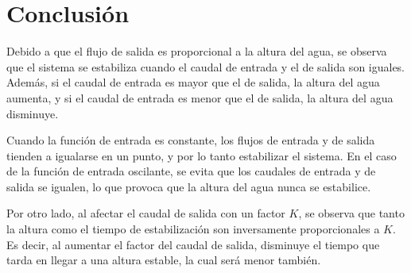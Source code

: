 \documentclass[12pt]{article}
\begin{document}
\section*{Conclusión}


Debido a que el flujo de salida es proporcional a la altura del agua, se observa que el sistema se estabiliza cuando el caudal de entrada y el de salida son iguales. Además, si el caudal de entrada es mayor que el de salida, la altura del agua aumenta, y si el caudal de entrada es menor que el de salida, la altura del agua disminuye.

Cuando la función de entrada es constante, los flujos de entrada y de salida tienden a igualarse en un punto, y por lo tanto estabilizar el sistema. En el caso de la función de entrada oscilante, se evita que los caudales de entrada y de salida se igualen, lo que provoca que la altura del agua nunca se estabilice.

Por otro lado, al afectar el caudal de salida con un factor $K$, se observa que tanto la altura como el tiempo de estabilización son inversamente proporcionales a $K$. Es decir, al aumentar el factor del caudal de salida, disminuye el tiempo que tarda en llegar a una altura estable, la cual será menor también.
\end{document}
